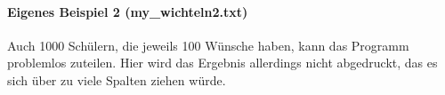 \documentclass[a4paper,10pt,ngerman]{scrartcl}
\begin{document}
\paragraph{Eigenes Beispiel 2 (my\_wichteln2.txt)}
Auch 1000 Schülern, die jeweils 100 Wünsche haben, kann das Programm problemlos zuteilen.
Hier wird das Ergebnis allerdings nicht abgedruckt, das es sich über zu viele Spalten ziehen würde.
\end{document}
